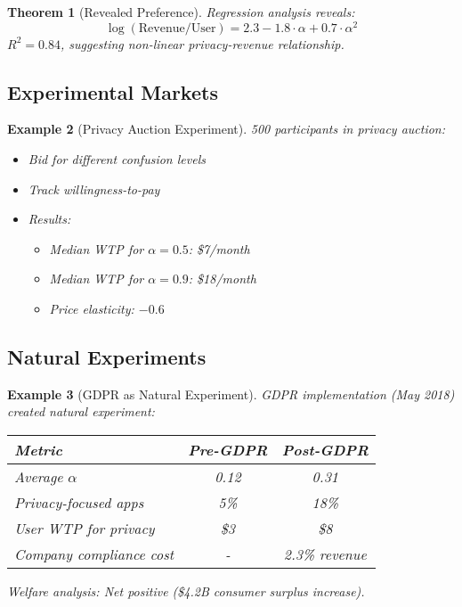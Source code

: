 \documentclass[11pt,final]{article}
\newtheorem{theorem}{Theorem}[section]
\newtheorem{example}[theorem]{Example}
\begin{document}
\begin{theorem}[Revealed Preference]
Regression analysis reveals:
\begin{equation}
\log(\text{Revenue/User}) = 2.3 - 1.8 \cdot \alpha + 0.7 \cdot \alpha^2
\end{equation}
$R^2 = 0.84$, suggesting non-linear privacy-revenue relationship.
\end{theorem}

\subsection{Experimental Markets}

\begin{example}[Privacy Auction Experiment]
500 participants in privacy auction:
\begin{itemize}
    \item Bid for different confusion levels
    \item Track willingness-to-pay
    \item Results:
    \begin{itemize}
        \item Median WTP for $\alpha = 0.5$: \$7/month
        \item Median WTP for $\alpha = 0.9$: \$18/month
        \item Price elasticity: $-0.6$
    \end{itemize}
\end{itemize}
\end{example}

\subsection{Natural Experiments}

\begin{example}[GDPR as Natural Experiment]
GDPR implementation (May 2018) created natural experiment:

\begin{center}
\begin{tabular}{lcc}
\toprule
\textbf{Metric} & \textbf{Pre-GDPR} & \textbf{Post-GDPR} \\
\midrule
Average $\alpha$ & 0.12 & 0.31 \\
Privacy-focused apps & 5\% & 18\% \\
User WTP for privacy & \$3 & \$8 \\
Company compliance cost & - & 2.3\% revenue \\
\bottomrule
\end{tabular}
\end{center}

Welfare analysis: Net positive (\$4.2B consumer surplus increase).
\end{example}
\end{document}
